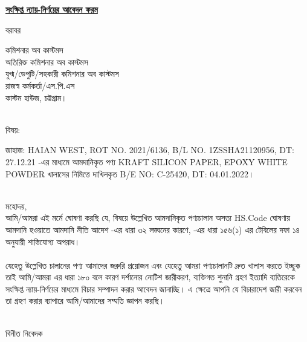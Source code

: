 \documentclass[12pt]{article}
\newcommand{\good}{KRAFT SILICON PAPER, EPOXY WHITE POWDER}
\newcommand{\vessel}{HAIAN WEST}
\newcommand{\blno}{1ZSSHA21120956}
\newcommand{\bldt}{27.12.21}
\newcommand{\beno}{C-25420}
\newcommand{\bedt}{04.01.2022}
\newcommand{\menifest}{2021/6136}
\begin{document}
\begin{center}
\textbf{\underline{সংক্ষিপ্ত ন্যায়-নির্ণয়ের আবেদন ফরম}}
\end{center}
\noindent
বরাবর
\\
\begin{minipage}[t]{0.06\linewidth}
\hspace{1em}
\end{minipage}
\begin{minipage}[t]{0.94\linewidth}
কমিশনার অব কাস্টমস
\\
অতিরিক্ত কমিশনার অব কাস্টমস
\\
যুগ্ম/ডেপুটি/সহকারী কমিশনার অব কাস্টমস
\\
রাজস্ব কর্মকর্তা/এস.পি.এস
\\
কাস্টম হাউজ,
চট্টগ্রাম।
\\
\\
\end{minipage}
\begin{minipage}[t]{0.06\linewidth}
বিষয়:
\end{minipage}
\begin{minipage}[t]{0.94\linewidth}
জাহাজ: {\vessel},
ROT NO. {\menifest},
B/L NO. {\blno},
DT: {\bldt}
-এর মাধ্যমে আমদানিকৃত পণ্য
{\good}
খালাসের নিমিত্তে
দাখিলকৃত
B/E NO: {\beno}, DT: {\bedt}।
\\
\\
\end{minipage}
মহোদয়,
\\
\hspace*{2.7em}আমি/আমরা এই মর্মে
ঘোষণা করছি যে, বিষয়ে উল্লেখিত আমদানিকৃত পণ্যচালান অসত্য
HS.Code
ঘোষণায়  আমদানি হওয়াতে
আমদানি নীতি আদেশ -এর ধারা ৩২ লঙ্ঘনের কারণে,
{\tca} -এর ধারা ১৫৬(১) এর টেবিলের দফা ১৪ অনুযায়ী
শাস্তিযোগ্য অপরাধ।
\\
\\
\hspace*{2.7em}
যেহেতু উল্লেখিত চালানের পণ্য আমাদের জরুরি প্রয়োজন
এবং যেহেতু আমরা পণ্যচালানটি দ্রুত খালাস করতে ইচ্ছুক
তাই আমি/আমরা {\tca} এর ধারা ১৮০ বলে কারণ দর্শানোর
নোটিশ জারীকরণ, ব্যক্তিগত শুনানি গ্রহণ ইত্যাদি ব্যতিরেকে
সংক্ষিপ্ত ন্যায়-নির্ণয়ের মাধ্যমে বিচার সম্পাদন করার আবেদন
জানাচ্ছি।
এ ক্ষেত্রে আপনি যে বিচারাদেশ জারী করবেন তা গ্রহণ করার
ব্যাপারে আমি/আমাদের সম্মতি জ্ঞাপন করছি।
\\
\\
\begin{minipage}[t]{0.55\linewidth}
\hspace{1em}
\end{minipage}
\begin{minipage}[t]{0.45\linewidth}
বিনীত নিবেদক
\\
\\
\\
\end{minipage}
\end{document}
